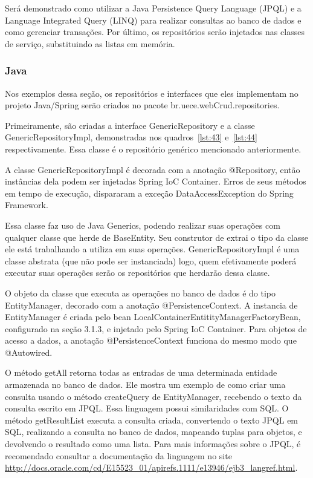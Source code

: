 \documentclass[a4paper,12pt]{article}
\newcommand{\javacode}[3] {
	
}
\begin{document}
Será demonstrado como utilizar a Java Persistence Query Language (JPQL) e a Language Integrated Query (LINQ) para realizar consultas ao banco de dados e como gerenciar transações. Por último, os repositórios serão injetados nas classes de serviço, substituindo as listas em memória.

\subsubsection{Java}

Nos exemplos dessa seção, os repositórios e interfaces que eles implementam no projeto Java/Spring serão criados no pacote br.uece.webCrud.repositories.

Primeiramente, são criadas a interface GenericRepository e a classe GenericRepositoryImpl, demonstradas nos quadros~\ref{lst:43} e~\ref{lst:44} respectivamente. Essa classe é o repositório genérico mencionado anteriormente.

\javacode{code/43.txt}{Interface GenericRepository}{lst:43}

\javacode{code/44.txt}{Classe GenericRepositoryImpl}{lst:44}

A classe GenericRepositoryImpl é decorada com a anotação @Repository, então instâncias dela podem ser injetadas Spring IoC Container. Erros de seus métodos em tempo de execução, dispararam a exceção DataAccessException do Spring Framework.

Essa classe faz uso de Java Generics, podendo realizar suas operações com qualquer classe que herde de BaseEntity. Seu construtor de extrai o tipo da classe ele está trabalhando a utiliza em suas operações. GenericRepositoryImpl é uma classe abstrata (que não pode ser instanciada) logo, quem efetivamente poderá executar suas operações serão os repositórios que herdarão dessa classe.

O objeto da classe que executa as operações no banco de dados é do tipo EntityManager, decorado com a anotação @PersistenceContext. A instancia de EntityManager é criada pelo bean LocalContainerEntitityManagerFactoryBean, configurado na seção 3.1.3, e injetado pelo Spring IoC Container. Para objetos de acesso a dados, a anotação @PersistenceContext funciona do mesmo modo que @Autowired.

O método getAll retorna todas as entradas de uma determinada entidade armazenada no banco de dados. Ele mostra um exemplo de como criar uma consulta usando o método createQuery de EntityManager, recebendo o texto da consulta escrito em JPQL. Essa linguagem possui similaridades com SQL. O método getResultList executa a consulta criada, convertendo o texto JPQL em SQL, realizando a consulta no banco de dados, mapeando tuplas para objetos, e devolvendo o resultado como uma lista. Para mais informações sobre o JPQL, é recomendado consultar a documentação da linguagem no site \url{http://docs.oracle.com/cd/E15523_01/apirefs.1111/e13946/ejb3_langref.html}.
\end{document}

